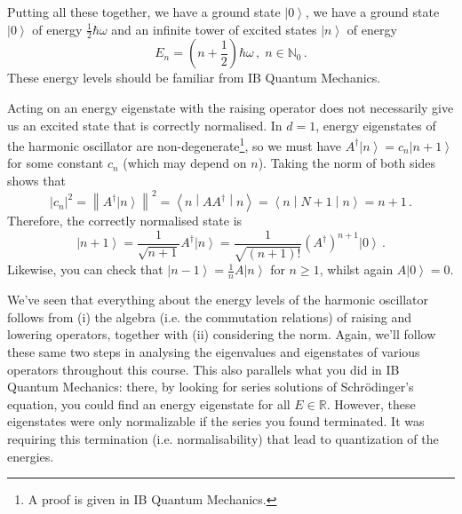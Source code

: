 \documentclass{article}
\theoremstyle{plain}\theoremheaderfont{\normalfont\itshape}\theorembodyfont{\rmfamily}\theoremseparator{.}\newtheorem*{rem}{Remark}\newtheorem*{ex}{Example}\newtheorem*{proof}{Proof}\newtheorem*{altp}{Alternative proof}
\theoremstyle{plain}\theoremheaderfont{\normalfont\bfseries}\theorembodyfont{\rmfamily}\theoremseparator{.}\newtheorem{thm}{Theorem}[section]\newtheorem{lem}[thm]{Lemma}\newtheorem{prop}[thm]{Proposition}\newtheorem*{cor}{Corollary}\newtheorem{defn}[thm]{Definition}\newtheorem{clm}[thm]{Claim}\newtheorem{clminproof}{Claim}
\theoremstyle{break}\theoremheaderfont{\normalfont\itshape}\theorembodyfont{\rmfamily}\theoremseparator{.\medskip}\newtheorem*{proofskip}{Proof}\newtheorem*{exs}{Examples}\newtheorem*{rems}{Remarks}
\theoremstyle{break}\theoremheaderfont{\normalfont\bfseries}\theorembodyfont{\rmfamily}\theoremseparator{.\medskip}\newtheorem{lemskip}[thm]{Lemma}\newtheorem{defnskip}[thm]{Definition}\newtheorem{propskip}[thm]{Proposition}\newtheorem{thmskip}[thm]{Theorem}
\numberwithin{equation}{section}
\newcommand{\ket}[1]{\left| #1 \right\rangle}
\newcommand{\expval}[2]{\left\langle #2 \middle| #1 \middle| #2 \right\rangle}
\newcommand{\abs}[1]{\left| #1 \right|}
\newcommand{\norm}[1]{\left\| #1 \right\|}
\newcommand{\NN}{\mathbb{N}}
\newcommand{\RR}{\mathbb{R}}
\begin{document}
    Putting all these together, we have a ground state \(\ket{0}\), we have a ground state \(\ket{0}\) of energy \(\frac{1}{2}\hbar\omega\) and an infinite tower of excited states \(\ket{n}\) of energy
    \begin{equation}
        E_n=\left(n+\frac{1}{2}\right)\hbar\omega\,,\; n\in\NN_0\,.
    \end{equation}
    These energy levels should be familiar from IB Quantum Mechanics.

    Acting on an energy eigenstate with the raising operator does not necessarily give us an excited state that is correctly normalised. In \(d=1\), energy eigenstates of the harmonic oscillator are non-degenerate\footnote{A proof is given in IB Quantum Mechanics.}, so we must have \(A^\dagger\ket{n}=c_n\ket{n+1}\) for some constant \(c_n\) (which may depend on \(n\)). Taking the norm of both sides shows that
    \begin{equation}
        \abs{c_n}^2=\norm{A^\dagger\ket{n}}^2=\expval{AA^\dagger}{n}=\expval{N+1}{n}=n+1\,.
    \end{equation}
    Therefore, the correctly normalised state is
    \begin{equation}
        \ket{n+1}=\frac{1}{\sqrt{n+1}}A^\dagger\ket{n}=\frac{1}{\sqrt{(n+1)!}}(A^\dagger)^{n+1}\ket{0}\,.
    \end{equation}
    Likewise, you can check that \(\ket{n-1}=\frac{1}{n}A\ket{n}\) for \(n\ge 1\), whilst again \(A\ket{0}=0\).

    We've seen that everything about the energy levels of the harmonic oscillator follows from (i) the algebra (i.e. the commutation relations) of raising and lowering operators, together with (ii) considering the norm. Again, we'll follow these same two steps in analysing the eigenvalues and eigenstates of various operators throughout this course. This also parallels what you did in IB Quantum Mechanics: there, by looking for series solutions of Schr\"{o}dinger's equation, you could find an energy eigenstate for all \(E\in\RR\). However, these eigenstates were only normalizable if the series you found terminated. It was requiring this termination (i.e. normalisability) that lead to quantization of the energies.
\end{document}
